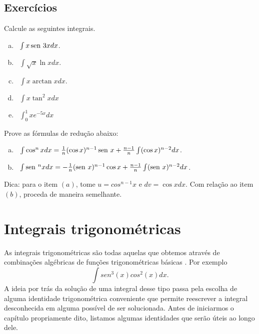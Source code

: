 \subsection*{Exercícios}

	\begin{exer}
		Calcule as seguintes integrais.
		\begin{enumerate}[a)]
			\item~$\int x \operatorname{sen}\,{3x} dx$.
			\item~$ \int \sqrt{x} \ln xdx$.
			\item~$\int x \arctan xdx$.
			\item~$\int x\tan^2xdx$
			\item ~$\int_{0}^{1}x e^{-5x}dx $
		\end{enumerate}
	\end{exer}
	
	\begin{exer}
		Prove as fórmulas de redução abaixo:
		\begin{enumerate}[a)]
			\item~$\int \cos^n xdx =  \frac{1}{n}(\cos x)^{n-1} \operatorname{sen}\, x + \frac{n-1}{n}\int (\cos x)^{n-2}dx$.
			\item~$\int \operatorname{sen}\,^n xdx =  - \frac{1}{n}(\operatorname{sen}\, x)^{n-1} \cos x + \frac{n-1}{n}\int (\operatorname{sen}\, x)^{n-2}dx$.
		\end{enumerate}	
		Dica: para o item $(a)$, tome $u=cos^{n-1}x$ e $dv = \cos xdx$. Com relação ao item $(b)$, proceda de maneira semelhante.
	\end{exer}
	

\section{Integrais trigonométricas}
	
	As integrais trigonométricas são todas aquelas que obtemos através de combinações algébricas de funções trigonométricas básicas . Por exemplo $$\int sen^3(x)cos^2(x)dx.$$ A ideia por trás da solução de uma integral desse tipo passa pela escolha de alguma identidade trigonométrica conveniente que permite reescrever a integral desconhecida em alguma possível de ser solucionada. Antes de iniciarmos o capítulo propriamente dito, listamos algumas identidades que serão úteis ao longo dele.
			
